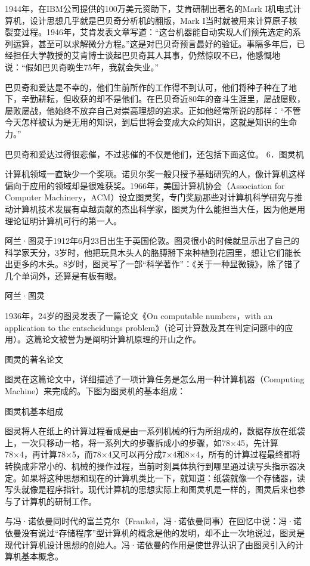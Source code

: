\documentclass[12pt,UTF8]{ctexbook}
\begin{document}
1944年，在IBM公司提供的100万美元资助下，艾肯研制出著名的Mark I机电式计算机，设计思想几乎就是巴贝奇分析机的翻版，Mark I当时就被用来计算原子核裂变过程。1946年，艾肯发表文章写道：“这台机器能自动实现人们预先选定的系列运算，甚至可以求解微分方程。”这是对巴贝奇预言最好的验证。事隔多年后，已经担任大学教授的艾肯博士谈起巴贝奇其人其事，仍然惊叹不已，他感慨地说：“假如巴贝奇晚生75年，我就会失业。”

巴贝奇和爱达是不幸的，他们生前所作的工作得不到认可，他们将种子种在了地下，辛勤耕耘，但收获的却不是他们。在巴贝奇近80年的奋斗生涯里，屡战屡败，屡败屡战，他始终不放弃自己对崇高理想的追求。正如他经常所说的那样：“不管今天怎样被认为是无用的知识，到后世将会变成大众的知识，这就是知识的生命力。”

巴贝奇和爱达过得很悲催，不过悲催的不仅是他们，还包括下面这位。
6．图灵机

计算机领域一直缺少一个奖项。诺贝尔奖一般只授予基础研究的人，像计算机这样偏向于应用的领域却是很难获奖。1966年，美国计算机协会（Association for Computer Machinery，ACM）设立图灵奖，专门奖励那些对计算机科学研究与推动计算机技术发展有卓越贡献的杰出科学家，图灵为什么能担当大任，因为他是用理论证明计算机可行的第一人。

阿兰·图灵于1912年6月23日出生于英国伦敦。图灵很小的时候就显示出了自己的科学家天分，3岁时，他把玩具木头人的胳膊掰下来种植到花园里，想让它们能长出更多的木头。8岁时，图灵写了一部“科学著作”：《关于一种显微镜》，除了错了几个单词外，还算是有板有眼。

阿兰·图灵

1936年，24岁的图灵发表了一篇论文《On computable numbers，with an application to the entscheidungs problem》（论可计算数及其在判定问题中的应用）。这篇论文被誉为是阐明计算机原理的开山之作。

图灵的著名论文

图灵在这篇论文中，详细描述了一项计算任务是怎么用一种计算机器（Computing Machine）来完成的。下图为图灵机的基本组成：

图灵机基本组成

图灵将人在纸上的计算过程看成是由一系列机械的行为所组成的，数据存放在纸袋上，一次只移动一格，将一系列大的步骤拆成小的步骤，如78×45，先计算78×4，再计算78×5，而78×4又可以再分成7×4和8×4，所有的计算过程最终都将转换成非常小的、机械的操作过程，当前时刻具体执行到哪里通过读写头指示器决定。如果将这种思想和现在的计算机类比一下，就知道：纸袋就像一个存储器，读写头就像是程序指针。现代计算机的思想实际上和图灵机是一样的，图灵后来也参与了计算机的研制工作。

与冯·诺依曼同时代的富兰克尔（Frankel，冯·诺依曼同事）在回忆中说：冯·诺依曼没有说过“存储程序”型计算机的概念是他的发明，却不止一次地说过，图灵是现代计算机设计思想的创始人。冯·诺依曼的作用是使世界认识了由图灵引入的计算机基本概念。
\end{document}
